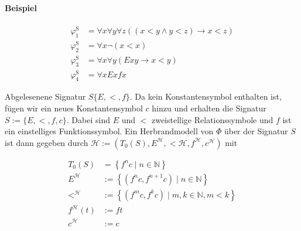 \documentclass[
    ngerman,
    color=3b,
    summary,
    boxarc,
    main,
    fleqn,
    leqno,
]{rubos-tuda-template}
\begin{document}
    \paragraph{Beispiel}
    \begin{ceqn}
        \begin{align*}
            \varphi_1^{\mathrm{S}} & =\forall x \forall y \forall z((x<y \wedge y<z) \rightarrow x<z) \\
            \varphi_2^{\mathrm{S}} & =\forall x \neg(x<x)                                             \\
            \varphi_3^{\mathrm{S}} & =\forall x \forall y(E x y \rightarrow x<y)                      \\
            \varphi_4^{\mathrm{S}} & =\forall x Exfx
        \end{align*}
    \end{ceqn}
    Abgelesenene Signatur $S\{E,<, f\}$.
    Da kein Konstantensymbol enthalten ist, fügen wir ein neues Konstantensymbol $c$ hinzu und erhalten die Signatur $S:=\{E,<, f, c\}$.
    Dabei sind $E$ und $<$ zweistellige Relationssymbole und $f$ ist ein einstelliges Funktionssymbol. Ein Herbrandmodell von $\Phi$ über der Signatur $S$ ist dann gegeben durch $\mathcal{H}:=\left(T_0(S), E^{\mathcal{H}},<\mathcal{H}, f^{\mathcal{H}}, c^{\mathcal{H}}\right)$ mit
    \begin{ceqn}
        \begin{align*}
            T_0(S)             & =\left\{f^n c \mid n \in \mathbb{N}\right\}                              \\
            E^{\mathcal{H}}    & :=\left\{\left(f^n c, f^{n+1} c\right) \mid n \in \mathbb{N}\right\}     \\
            <^{\mathcal{H}}    & :=\left\{\left(f^m c, f^k c\right) \mid m, k \in \mathbb{N}, m<k\right\} \\
            f^{\mathcal{H}}(t) & :=f t                                                                    \\
            c^{\mathcal{H}}    & :=c
        \end{align*}
    \end{ceqn}
\end{document}
